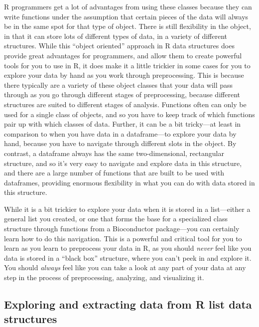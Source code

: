 \documentclass[]{tufte-book}
\begin{document}
R programmers get a lot of advantages from using these classes because they can
write functions under the assumption that certain pieces of the data will always
be in the same spot for that type of object. There is still flexibility in the
object, in that it can store lots of different types of data, in a variety of
different structures. While this ``object oriented'' approach in R data structures
does provide great advantages for programmers, and allow them to create powerful
tools for you to use in R, it does make it a little trickier in some cases for
you to explore your data by hand as you work through preprocessing. This is
because there typically are a variety of these object classes that your data
will pass through as you go through different stages of preprocessing, because
different structures are suited to different stages of analysis. Functions often
can only be used for a single class of objects, and so you have to keep track of
which functions pair up with which classes of data. Further, it can be a bit
tricky---at least in comparison to when you have data in a dataframe---to
explore your data by hand, because you have to navigate through different slots
in the object. By contrast, a dataframe always has the same two-dimensional,
rectangular structure, and so it's very easy to navigate and explore data in
this structure, and there are a large number of functions that are built to be
used with dataframes, providing enormous flexibility in what you can do with
data stored in this structure.

While it is a bit trickier to explore your data when it is stored in a
list---either a general list you created, or one that forms the base for a
specialized class structure through functions from a Bioconductor package---you
can certainly learn how to do this navigation. This is a powerful and critical
tool for you to learn as you learn to preprocess your data in R, as you should
\emph{never} feel like you data is stored in a ``black box'' structure, where you can't
peek in and explore it. You should \emph{always} feel like you can take a look at any
part of your data at any step in the process of preprocessing, analyzing, and
visualizing it.

\hypertarget{exploring-and-extracting-data-from-r-list-data-structures}{%
\subsection{Exploring and extracting data from R list data structures}\label{exploring-and-extracting-data-from-r-list-data-structures}}
\end{document}
